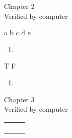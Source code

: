 \documentclass{report}
\begin{document}
\begin{flushleft}
\begin{minipage}{\linewidth}
\begin{minipage}{0.45\textwidth}
\begin{center}
Chapter 2\\
Verified by computer\\
\end{center}
\hspace{30pt} a\hspace{3pt} b\hspace{3pt} c\hspace{3pt} d\hspace{3pt} e\hspace{3pt} %
\begin{enumerate}
  \itemsep0em
\setcounter{enumi}{0}
\item \fbox{
\mbox{\ooalign{$\square$}} \mbox{\ooalign{$\square$}} \mbox{\ooalign{$\square$}} \mbox{\ooalign{$\square$}} \mbox{\ooalign{$\square$}} 
}
	
		
\end{enumerate}
\hspace{25pt} T\hspace{3pt} F%
\begin{enumerate}
  \itemsep0em
	
\setcounter{enumi}{1}
\item \fbox{\mbox{\ooalign{$\square$}} \mbox{\ooalign{$\square$}}}
	
		
\end{enumerate}
\end{minipage}
\hfill %
\begin{minipage}{0.45\textwidth}
\begin{center}
Chapter 3\\
Verified by computer\\
\end{center}
\begin{tabular}{|p{\textwidth}}
\begin{enumerate}


\end{enumerate}
\end{tabular}
\end{minipage}
\end{minipage}
\end{flushleft}
\end{document}
